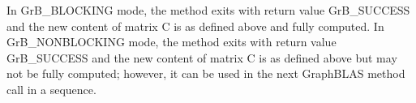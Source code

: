 In {\sf GrB\_BLOCKING} mode, the method exits with return value 
{\sf GrB\_SUCCESS} and the new content of matrix {\sf C} is as defined above
and fully computed.  
In {\sf GrB\_NONBLOCKING} mode, the method exits with return value 
{\sf GrB\_SUCCESS} and the new content of matrix {\sf C} is as defined above 
but may not be fully computed; however, it can be used in the next GraphBLAS 
method call in a sequence.
